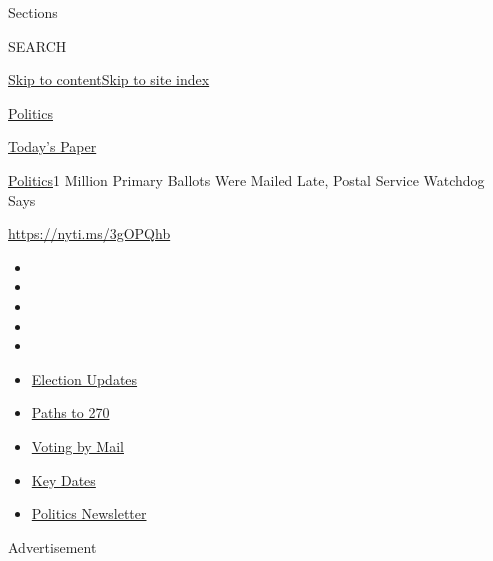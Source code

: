Sections

SEARCH

\protect\hyperlink{site-content}{Skip to
content}\protect\hyperlink{site-index}{Skip to site index}

\href{https://www.nytimes3xbfgragh.onion/section/politics}{Politics}

\href{https://myaccount.nytimes3xbfgragh.onion/auth/login?response_type=cookie\&client_id=vi}{}

\href{https://www.nytimes3xbfgragh.onion/section/todayspaper}{Today's
Paper}

\href{/section/politics}{Politics}\textbar{}1 Million Primary Ballots
Were Mailed Late, Postal Service Watchdog Says

\url{https://nyti.ms/3gOPQhb}

\begin{itemize}
\item
\item
\item
\item
\item
\end{itemize}

\begin{itemize}
\item
  \href{https://www.nytimes3xbfgragh.onion/live/2020/09/08/us/trump-vs-biden?action=click\&pgtype=Article\&state=default\&region=TOP_BANNER\&context=storylines_menu}{Election
  Updates}
\item
  \href{https://www.nytimes3xbfgragh.onion/interactive/2020/us/elections/election-states-biden-trump.html?action=click\&pgtype=Article\&state=default\&region=TOP_BANNER\&context=storylines_menu}{Paths
  to 270}
\item
  \href{https://www.nytimes3xbfgragh.onion/interactive/2020/08/31/us/politics/vote-by-mail-deadlines.html?action=click\&pgtype=Article\&state=default\&region=TOP_BANNER\&context=storylines_menu}{Voting
  by Mail}
\item
  \href{https://www.nytimes3xbfgragh.onion/interactive/2019/us/elections/2020-presidential-election-calendar.html?action=click\&pgtype=Article\&state=default\&region=TOP_BANNER\&context=storylines_menu}{Key
  Dates}
\item
  \href{https://www.nytimes3xbfgragh.onion/newsletters/politics?action=click\&pgtype=Article\&state=default\&region=TOP_BANNER\&context=storylines_menu}{Politics
  Newsletter}
\end{itemize}

Advertisement

